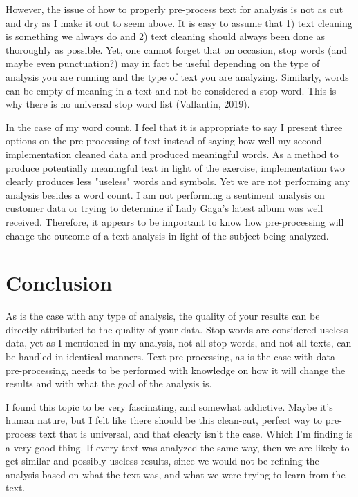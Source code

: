 \documentclass[]{article}
\begin{document}
However, the issue of how to properly pre-process text for analysis is not as cut and dry as I make it out to seem above.  It is easy to assume that 1) text cleaning is something we always do and 2) text cleaning should always been done as thoroughly as possible.  Yet, one cannot forget that on occasion, stop words (and maybe even punctuation?) may in fact be useful depending on the type of analysis you are running and the type of text you are analyzing.  Similarly, words can be empty of meaning in a text and not be considered a stop word.  This is why there is no universal stop word list (Vallantin, 2019). 

In the case of my word count, I feel that it is appropriate to say I present three options on the pre-processing of text instead of saying how well my second implementation cleaned data and produced meaningful words.  As a method to produce potentially meaningful text in light of the exercise, implementation two clearly produces less "useless" words and symbols.  Yet we are not performing any analysis besides a word count.  I am not performing a sentiment analysis on customer data or trying to determine if Lady Gaga's latest album was well received.  Therefore, it appears to be important to know how pre-processing will change the outcome of a text analysis in light of the subject being analyzed.
  
\section{Conclusion}
As is the case with any type of analysis, the quality of your results can be directly attributed to the quality of your data.  Stop words are considered useless data, yet as I mentioned in my analysis, not all stop words, and not all texts, can be handled in identical manners.  Text pre-processing, as is the case with data pre-processing, needs to be performed with knowledge on how it will change the results and with what the goal of the analysis is.

I found this topic to be very fascinating, and somewhat addictive.  Maybe it's human nature, but I felt like there should be this clean-cut, perfect way to pre-process text that is universal, and that clearly isn't the case.  Which I'm finding is a very good thing.  If every text was analyzed the same way, then we are likely to get similar and possibly useless results, since we would not be refining the analysis based on what the text was, and what we were trying to learn from the text.
\end{document}
